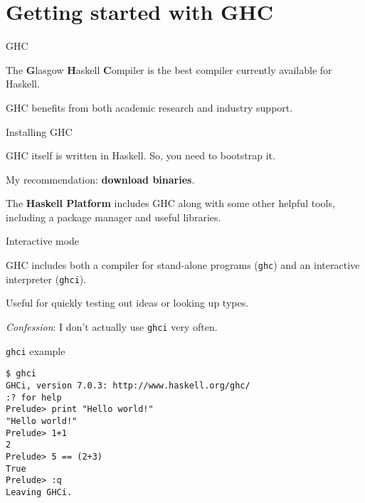 
\section{Getting started with GHC}

%
\begin{frame}{GHC}

The \textbf{G}lasgow \textbf{H}askell \textbf{C}ompiler is the best compiler
currently available for Haskell.

GHC benefits from both academic research and industry support.

\end{frame}

%
\begin{frame}{Installing GHC}

GHC itself is written in Haskell. So, you need to bootstrap it.

My recommendation: \textbf{download binaries}.

The \textbf{Haskell Platform} includes GHC along with some other helpful tools,
including a package manager and useful libraries.


\end{frame}

%
\begin{frame}{Interactive mode}

GHC includes both a compiler for stand-alone programs (\texttt{ghc}) and an
interactive interpreter (\texttt{ghci}).

Useful for quickly testing out ideas or looking up types.

\emph{Confession}: I don't actually use \texttt{ghci} very often.

\end{frame}

%
\begin{frame}[fragile]{\texttt{ghci} example}

\begin{block}{}
\begin{verbatim}
$ ghci
GHCi, version 7.0.3: http://www.haskell.org/ghc/
:? for help
Prelude> print "Hello world!"
"Hello world!"
Prelude> 1+1
2
Prelude> 5 == (2+3)
True
Prelude> :q
Leaving GHCi.
\end{verbatim}
\end{block}

\end{frame}

